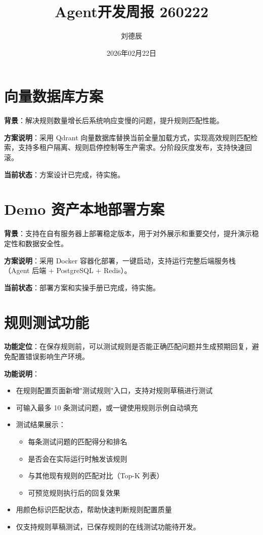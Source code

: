 \documentclass[UTF8]{ctexart}
\title{Agent开发周报 260222}
\author{刘德辰}
\date{2026年02月22日}
\begin{document}
\maketitle

\section{向量数据库方案}

\textbf{背景}：解决规则数量增长后系统响应变慢的问题，提升规则匹配性能。

\textbf{方案说明}：采用 Qdrant 向量数据库替换当前全量加载方式，实现高效规则匹配检索，支持多租户隔离、规则启停控制等生产需求。分阶段灰度发布，支持快速回滚。

\textbf{当前状态}：方案设计已完成，待实施。

\section{Demo 资产本地部署方案}

\textbf{背景}：支持在自有服务器上部署稳定版本，用于对外展示和重要交付，提升演示稳定性和数据安全性。

\textbf{方案说明}：采用 Docker 容器化部署，一键启动，支持运行完整后端服务栈（Agent 后端 + PostgreSQL + Redis）。

\textbf{当前状态}：部署方案和实操手册已完成，待实施。

\section{规则测试功能}

\textbf{功能定位}：在保存规则前，可以测试规则是否能正确匹配问题并生成预期回复，避免配置错误影响生产环境。

\textbf{功能说明}：
\begin{itemize}
    \item 在规则配置页面新增"测试规则"入口，支持对规则草稿进行测试
    \item 可输入最多 10 条测试问题，或一键使用规则示例自动填充
    \item 测试结果展示：
    \begin{itemize}
        \item 每条测试问题的匹配得分和排名
        \item 是否会在实际运行时触发该规则
        \item 与其他现有规则的匹配对比（Top-K 列表）
        \item 可预览规则执行后的回复效果
    \end{itemize}
    \item 用颜色标识匹配状态，帮助快速判断规则配置质量
    \item 仅支持规则草稿测试，已保存规则的在线测试功能待开发。
\end{itemize}
\end{document}
